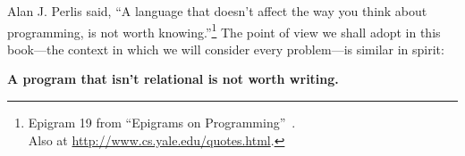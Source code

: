 Alan J. Perlis said, ``A language that doesn't affect the way you think about programming, is not worth knowing.''\footnote{Epigram 19 from ``Epigrams on Programming''~\cite{Perlis:1982:SFE:947955.1083808}.\\Also at \url{http://www.cs.yale.edu/quotes.html}.}
%
The point of view we shall adopt in this book---the context in which
we will consider every problem---is similar in spirit:

\large
{\bf A program that isn't relational is not worth writing.}
\normalsize
